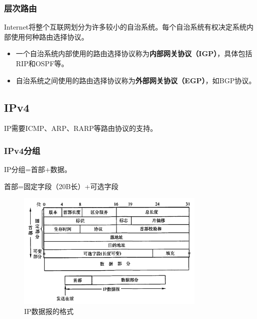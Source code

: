 \documentclass[12pt, a4paper, oneside]{ctexart}
\begin{document}
\subsubsection{层次路由}

Internet将整个互联网划分为许多较小的自治系统。每个自治系统有权决定系统内部使用何种路由选择协议。
\begin{itemize}
    \item 一个自治系统内部使用的路由选择协议称为\textbf{内部网关协议（IGP）}，具体包括RIP和OSPF等。
    \item 自治系统之间使用的路由选择协议称为\textbf{外部网关协议（EGP）}，如BGP协议。
\end{itemize}

\subsection{IPv4}

IP需要ICMP、ARP、RARP等路由协议的支持。

\subsubsection{IPv4分组}

IP分组=首部+数据。

首部=固定字段（20B长）+可选字段

\begin{figure}
    \centering
    \includegraphics[width=0.8\textwidth]{./images/ip_datagram.png}
    \caption{IP数据报的格式}
\end{figure}
\end{document}
